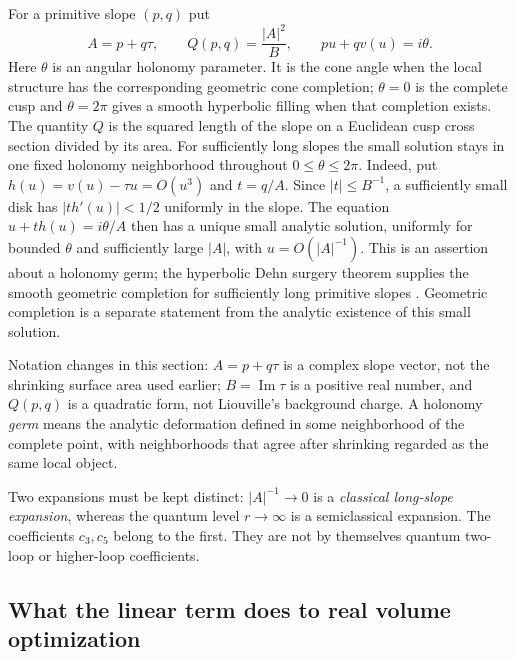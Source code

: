 For a primitive slope $(p,q)$ put
\begin{equation}
 A=p+q\tau,\qquad Q(p,q)=\frac{|A|^2}{B},\qquad
 pu+qv(u)=i\theta.
 \label{eq:dehncone}
\end{equation}
Here $\theta$ is an angular holonomy parameter. It is the cone angle
when the local structure has the corresponding geometric cone completion;
$\theta=0$ is the complete cusp and $\theta=2\pi$ gives a smooth
hyperbolic filling when that completion exists. The quantity $Q$ is the squared length of
the slope on a Euclidean cusp cross section divided by its area.
For sufficiently long slopes the small solution stays in one fixed
holonomy neighborhood throughout $0\leq\theta\leq2\pi$. Indeed, put
$h(u)=v(u)-\tau u=O(u^3)$ and $t=q/A$. Since
$|t|\leq B^{-1}$, a sufficiently small disk has
$|t h'(u)|<1/2$ uniformly in the slope. The equation
$u+t h(u)=i\theta/A$ then has a unique small analytic solution,
uniformly for bounded $\theta$ and sufficiently large $|A|$, with
$u=O(|A|^{-1})$. This is an assertion about a holonomy germ;
the hyperbolic Dehn surgery theorem supplies the smooth geometric
completion for sufficiently long primitive slopes
\cite[Section 4]{NeumannZagier}. Geometric completion is a separate
statement from the analytic existence of this small solution.

Notation changes in this section: $A=p+q\tau$ is a complex
slope vector, not the shrinking surface area used earlier;
$B=\operatorname{Im}\tau$ is a positive real number, and $Q(p,q)$
is a quadratic form, not Liouville's background charge.
A holonomy \emph{germ} means the analytic deformation defined in
some neighborhood of the complete point, with neighborhoods that
agree after shrinking regarded as the same local object.

Two expansions must be kept distinct: $|A|^{-1}\to0$ is a
\emph{classical long-slope expansion}, whereas the quantum level
$r\to\infty$ is a semiclassical expansion. The coefficients $c_3,c_5$
belong to the first. They are not by themselves quantum two-loop
or higher-loop coefficients.

\subsection{What the linear term does to real volume optimization}

